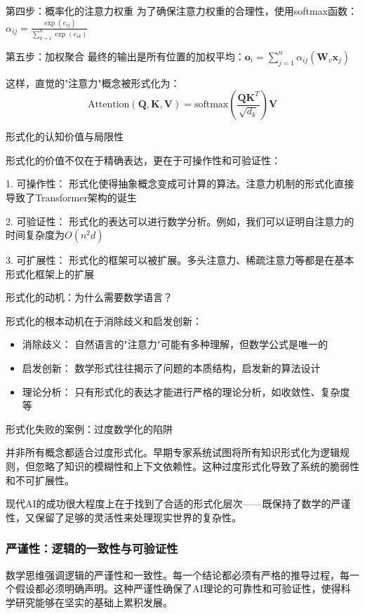 第四步：概率化的注意力权重
为了确保注意力权重的合理性，使用softmax函数：$\alpha_{ij} = \frac{\exp(e_{ij})}{\sum_{k=1}^{n} \exp(e_{ik})}$

第五步：加权聚合
最终的输出是所有位置的加权平均：$\mathbf{o}_i = \sum_{j=1}^{n} \alpha_{ij} (\mathbf{W}_v \mathbf{x}_j)$

这样，直觉的"注意力"概念被形式化为：
$$\text{Attention}(\mathbf{Q}, \mathbf{K}, \mathbf{V}) = \text{softmax}\left(\frac{\mathbf{Q}\mathbf{K}^T}{\sqrt{d_k}}\right)\mathbf{V}$$

形式化的认知价值与局限性

形式化的价值不仅在于精确表达，更在于可操作性和可验证性：

1. 可操作性： 形式化使得抽象概念变成可计算的算法。注意力机制的形式化直接导致了Transformer架构的诞生

2. 可验证性： 形式化的表达可以进行数学分析。例如，我们可以证明自注意力的时间复杂度为$O(n^2 d)$

3. 可扩展性： 形式化的框架可以被扩展。多头注意力、稀疏注意力等都是在基本形式化框架上的扩展

形式化的动机：为什么需要数学语言？

形式化的根本动机在于消除歧义和启发创新：

\begin{itemize}
\item 消除歧义： 自然语言的"注意力"可能有多种理解，但数学公式是唯一的
\item 启发创新： 数学形式往往揭示了问题的本质结构，启发新的算法设计
\item 理论分析： 只有形式化的表达才能进行严格的理论分析，如收敛性、复杂度等
\end{itemize}

形式化失败的案例：过度数学化的陷阱

并非所有概念都适合过度形式化。早期专家系统试图将所有知识形式化为逻辑规则，但忽略了知识的模糊性和上下文依赖性。这种过度形式化导致了系统的脆弱性和不可扩展性。

现代AI的成功很大程度上在于找到了合适的形式化层次——既保持了数学的严谨性，又保留了足够的灵活性来处理现实世界的复杂性。

\subsubsection{严谨性：逻辑的一致性与可验证性}

数学思维强调逻辑的严谨性和一致性。每一个结论都必须有严格的推导过程，每一个假设都必须明确声明。这种严谨性确保了AI理论的可靠性和可验证性，使得科学研究能够在坚实的基础上累积发展。

